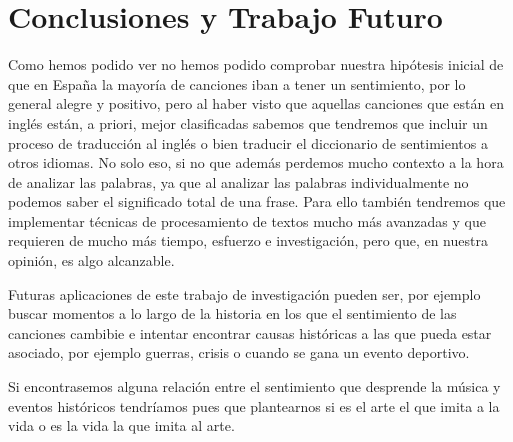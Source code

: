 \chapter{Conclusiones y Trabajo Futuro}
\label{cap:conclusiones}

Como hemos podido ver no hemos podido comprobar nuestra hipótesis inicial de que en España la mayoría de canciones iban a tener un sentimiento, por lo general alegre y positivo, pero al haber visto que aquellas canciones que están en inglés están, a priori, mejor clasificadas sabemos que tendremos que incluir un proceso de traducción al inglés o bien traducir el diccionario de sentimientos a otros idiomas. No solo eso, si no que además perdemos mucho contexto a la hora de analizar las palabras, ya que al analizar las palabras individualmente no podemos saber el significado total de una frase. Para ello también tendremos que implementar técnicas de procesamiento de textos mucho más avanzadas y que requieren de mucho más tiempo, esfuerzo e investigación, pero que, en nuestra opinión, es algo alcanzable.

Futuras aplicaciones de este trabajo de investigación pueden ser, por ejemplo buscar momentos a lo largo de la historia en los que el sentimiento de las canciones cambibie e intentar encontrar causas históricas a las que pueda estar asociado, por ejemplo guerras, crisis o cuando se gana un evento deportivo. 

Si encontrasemos alguna relación entre el sentimiento que desprende la música y eventos históricos tendríamos pues que plantearnos si es el arte el que imita a la vida o es la vida la que imita al arte.